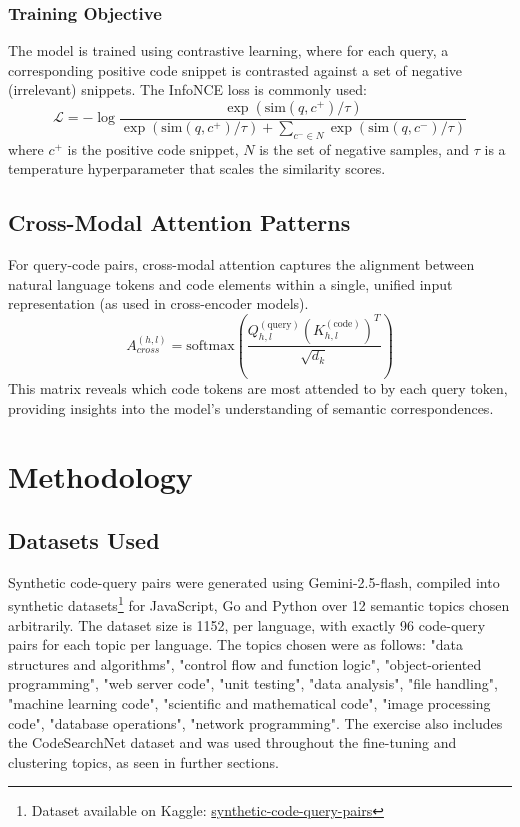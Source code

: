 \documentclass[conference]{IEEEtran}
\begin{document}
\subsubsection{Training Objective}
The model is trained using contrastive learning, where for each query, a corresponding positive code snippet is contrasted against a set of negative (irrelevant) snippets. The InfoNCE loss is commonly used:
\begin{equation}
    \mathcal{L} = -\log \frac{\exp(\text{sim}(q, c^+)/\tau)}{\exp(\text{sim}(q, c^+)/\tau) + \sum_{c^- \in N} \exp(\text{sim}(q, c^-)/\tau)}
    \label{eq:infonce_loss}
\end{equation}
where $c^+$ is the positive code snippet, $N$ is the set of negative samples, and $\tau$ is a temperature hyperparameter that scales the similarity scores.

\subsection{Cross-Modal Attention Patterns}
\label{ssec:cross_modal_attention}
For query-code pairs, cross-modal attention captures the alignment between natural language tokens and code elements within a single, unified input representation (as used in cross-encoder models).
\begin{equation}
    A_{cross}^{(h,l)} = \text{softmax}\left(\frac{Q_{h,l}^{(\text{query})}(K_{h,l}^{(\text{code})})^T}{\sqrt{d_k}}\right)
    \label{eq:cross_attention}
\end{equation}
This matrix reveals which code tokens are most attended to by each query token, providing insights into the model's understanding of semantic correspondences.

\section{Methodology}
\subsection{Datasets Used}
Synthetic code-query pairs were generated using Gemini-2.5-flash, compiled into synthetic datasets\footnote{Dataset available on Kaggle: \href{https://www.kaggle.com/datasets/mohitnair512/synthetic-code-query-pairs-golang-js-and-python}{synthetic-code-query-pairs}} for JavaScript, Go and Python over 12 semantic topics chosen arbitrarily. The dataset size is 1152, per language, with exactly 96 code-query pairs for each topic per language. The topics chosen were as follows: "data structures and algorithms", "control flow and function logic", "object-oriented programming", "web server code", "unit testing", "data analysis", "file handling", "machine learning code", "scientific and mathematical code", "image processing code", "database operations", "network programming".
The exercise also includes the CodeSearchNet dataset and was used throughout the fine-tuning and clustering topics, as seen in further sections.
\end{document}
